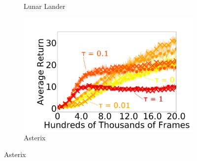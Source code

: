 \documentclass{article}
\begin{document}
\begin{figure}[t]
\begin{subfigure}[b]{0.25\linewidth}
    \caption{Lunar Lander}
    \label{fig:lunar-lander}
  \end{subfigure}%
  \begin{subfigure}[b]{0.25\linewidth}
    \centering
    \includegraphics[width=\columnwidth]{figs/deep/discrete/labeled_asterix.png} 
    \caption{Asterix
    }\label{fig:asterix}
  \end{subfigure}%
  

\end{figure}
\end{document}
